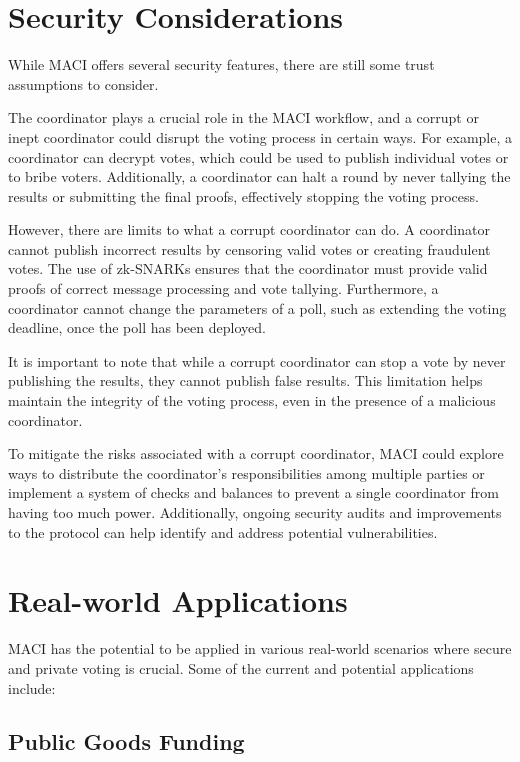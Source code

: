 \documentclass[11pt]{article}
\begin{document}
\section{Security Considerations}
\label{sec:orgcdd25c4}

While MACI offers several security features, there are still some trust assumptions to consider.

The coordinator plays a crucial role in the MACI workflow, and a corrupt or inept coordinator could disrupt the voting process in certain ways. For example, a coordinator can decrypt votes, which could be used to publish individual votes or to bribe voters. Additionally, a coordinator can halt a round by never tallying the results or submitting the final proofs, effectively stopping the voting process.

However, there are limits to what a corrupt coordinator can do. A coordinator cannot publish incorrect results by censoring valid votes or creating fraudulent votes. The use of zk-SNARKs ensures that the coordinator must provide valid proofs of correct message processing and vote tallying. Furthermore, a coordinator cannot change the parameters of a poll, such as extending the voting deadline, once the poll has been deployed.

It is important to note that while a corrupt coordinator can stop a vote by never publishing the results, they cannot publish false results. This limitation helps maintain the integrity of the voting process, even in the presence of a malicious coordinator.

To mitigate the risks associated with a corrupt coordinator, MACI could explore ways to distribute the coordinator's responsibilities among multiple parties or implement a system of checks and balances to prevent a single coordinator from having too much power. Additionally, ongoing security audits and improvements to the protocol can help identify and address potential vulnerabilities.
\section{Real-world Applications}
\label{sec:org2f37316}

MACI has the potential to be applied in various real-world scenarios where secure and private voting is crucial. Some of the current and potential applications include:
\subsection{Public Goods Funding}
\label{sec:org34205f6}
\end{document}
